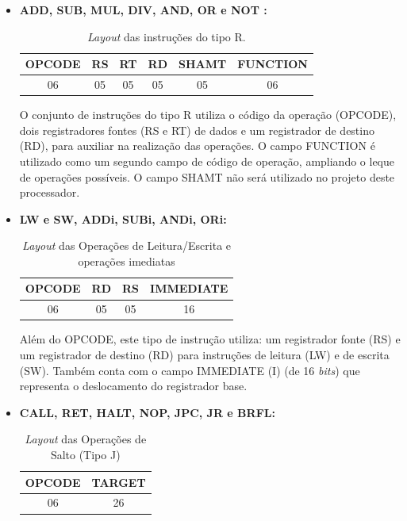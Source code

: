 \documentclass{report}
\begin{document}
  \begin{itemize}
     
     \item \textbf{ADD, SUB, MUL, DIV, AND, OR e NOT :}

  \begin{table}[H]
\centering
	\begin{tabular}{|c|c|c|c|c|c|}
  	\hline 
  	\textbf{OPCODE} & \textbf{RS} & \textbf{RT} & \textbf{RD} & \textbf{SHAMT} & \textbf{FUNCTION} \\ 
  	\hline 
  	06 & 05 & 05 & 05 & 05 & 06 \\ 
  	\hline 
  	\end{tabular} 
  	\caption{\textit{Layout} das instruções do tipo R.}
  \end{table}
  
  O conjunto de instruções do tipo R utiliza o código da operação (OPCODE), dois registradores fontes (RS e RT) de dados e um registrador de destino (RD), para auxiliar na realização das operações. O campo FUNCTION é utilizado como um segundo campo de código de operação, ampliando o leque de operações possíveis. O campo SHAMT não será utilizado no projeto deste processador.\\
  
   \item \textbf{LW e SW, ADDi, SUBi, ANDi, ORi:}

  \begin{table}[H]
\centering
	\begin{tabular}{|c|c|c|c|}
  	\hline 
  	\textbf{OPCODE} & \textbf{RD} & \textbf{RS} & \textbf{IMMEDIATE}  \\ 
  	\hline 
  	06 & 05 & 05 & 16 \\ 
  	\hline 
  	\end{tabular} 
  	\caption{\textit{Layout} das Operações de Leitura/Escrita e operações imediatas}
  \end{table}
  
  Além do OPCODE, este tipo de instrução utiliza: um registrador fonte (RS) e um registrador de destino (RD) para instruções de leitura (LW) e de escrita (SW). Também conta com o campo IMMEDIATE (I) (de 16 \textit{bits}) que representa o deslocamento do registrador base.\\
  
  \item \textbf{CALL, RET, HALT, NOP, JPC, JR e BRFL:}

  \begin{table}[H]
\centering
	\begin{tabular}{|c|c|}
  	\hline 
  	\textbf{OPCODE} & \textbf{TARGET} \\ 
  	\hline 
  	06 & 26 \\ 
  	\hline 
  	\end{tabular} 
  	\caption{\textit{Layout} das Operações de Salto (Tipo J)}
  \end{table}
  

\end{itemize}
\end{document}
